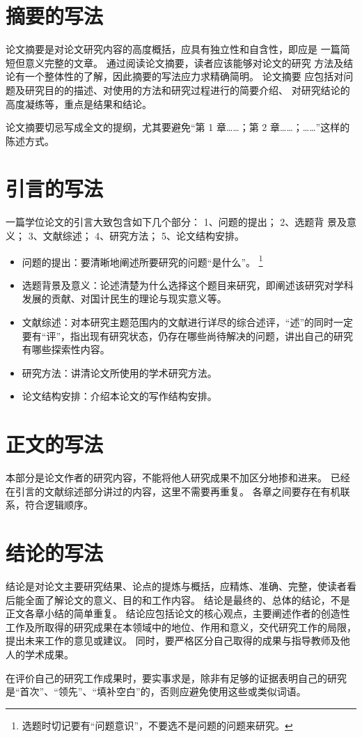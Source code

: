 \section{摘要的写法}

论文摘要是对论文研究内容的高度概括，应具有独立性和自含性，即应是 一篇简短但意义完整的文章。
通过阅读论文摘要，读者应该能够对论文的研究 方法及结论有一个整体性的了解，因此摘要的写法应力求精确简明。
论文摘要 应包括对问题及研究目的的描述、对使用的方法和研究过程进行的简要介绍、 对研究结论的高度凝练等，重点是结果和结论。

论文摘要切忌写成全文的提纲，尤其要避免“第 1 章……；第 2 章……；……”这样的陈述方式。



\section{引言的写法}

一篇学位论文的引言大致包含如下几个部分：
1、问题的提出；
2、选题背 景及意义；
3、文献综述；
4、研究方法；
5、论文结构安排。
\begin{itemize}
  \item 问题的提出：要清晰地阐述所要研究的问题“是什么”。
    \footnote{选题时切记要有“问题意识”，不要选不是问题的问题来研究。}
  \item 选题背景及意义：论述清楚为什么选择这个题目来研究，即阐述该研究对学科发展的贡献、对国计民生的理论与现实意义等。
  \item 文献综述：对本研究主题范围内的文献进行详尽的综合述评，“述”的同时一定要有“评”，指出现有研究状态，仍存在哪些尚待解决的问题，讲出自己的研究有哪些探索性内容。
  \item 研究方法：讲清论文所使用的学术研究方法。
  \item 论文结构安排：介绍本论文的写作结构安排。
\end{itemize}



\section{正文的写法}

本部分是论文作者的研究内容，不能将他人研究成果不加区分地掺和进来。
已经在引言的文献综述部分讲过的内容，这里不需要再重复。
各章之间要存在有机联系，符合逻辑顺序。



\section{结论的写法}

结论是对论文主要研究结果、论点的提炼与概括，应精炼、准确、完整，使读者看后能全面了解论文的意义、目的和工作内容。
结论是最终的、总体的结论，不是正文各章小结的简单重复。
结论应包括论文的核心观点，主要阐述作者的创造性工作及所取得的研究成果在本领域中的地位、作用和意义，交代研究工作的局限，提出未来工作的意见或建议。
同时，要严格区分自己取得的成果与指导教师及他人的学术成果。

在评价自己的研究工作成果时，要实事求是，除非有足够的证据表明自己的研究是“首次”、“领先”、“填补空白”的，否则应避免使用这些或类似词语。

